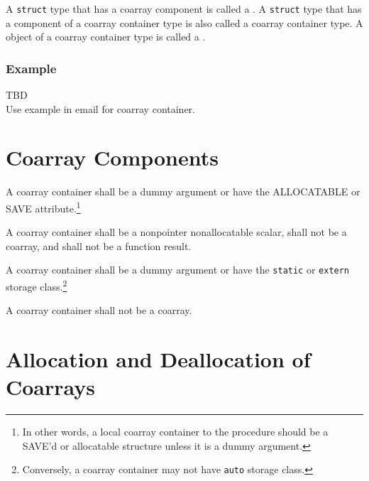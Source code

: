 {\onlyC}
A {\tt struct} type that has a coarray component is called 
a .
A {\tt struct} type that has a component of a coarray container type 
is also called a coarray container type.
A object of a coarray container type is called 
a .

\subsubsection*{Example}
TBD\\
Use example in email for coarray container.




\section{Coarray Components}
\label{sec:Coarray Components}

\begin{Constraints F}
\item A coarray container shall be a dummy argument or have 
the ALLOCATABLE or SAVE attribute.\footnote
{In other words, a local coarray container to the procedure should be a SAVE'd or 
allocatable structure unless it is a dummy argument.}

\item A coarray container shall be a nonpointer nonallocatable scalar, 
shall not be a coarray, and shall not be a function result. 
\end{Constraints F}

\begin{Constraints C}
\item A coarray container shall be a dummy argument or have the {\tt static} 
or {\tt extern} storage class.\footnote
{Conversely, a coarray container may not have {\tt auto} storage class.}

\item A coarray container shall not be a coarray.

\end{Constraints C}




\section{Allocation and Deallocation of Coarrays}
\label{sec:Allocation and Deallocation of Coarrays}

